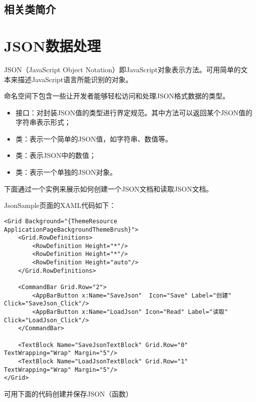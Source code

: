 \subsection{相关类简介}

\section{JSON数据处理}

JSON（JavaScript Object Notation）即JavaScript对象表示方法。可用简单的文本来描述JavaScript语言所能识别的对象。

命名空间下包含一些让开发者能够轻松访问和处理JSON格式数据的类型。

\begin{itemize}
	\item {}接口：对封装JSON值的类型进行界定规范。其中方法可以返回某个JSON值的字符串表示形式；
	\item {}类：表示一个简单的JSON值，如字符串、数值等。
	\item {}类：表示JSON中的数值；
	\item {}类：表示一个单独的JSON对象。
\end{itemize}

下面通过一个实例来展示如何创建一个JSON文档和读取JSON文档。

JsonSample页面的XAML代码如下：

\begin{lstlisting}[style=XamlStyle]
<Grid Background="{ThemeResource ApplicationPageBackgroundThemeBrush}">
	<Grid.RowDefinitions>
		<RowDefinition Height="*"/>
		<RowDefinition Height="*"/>
		<RowDefinition Height="auto"/>
	</Grid.RowDefinitions>

	<CommandBar Grid.Row="2">
		<AppBarButton x:Name="SaveJson"  Icon="Save" Label="创建" Click="SaveJson_Click"/>
		<AppBarButton x:Name="LoadJson" Icon="Read" Label="读取" Click="LoadJson_Click"/>
	</CommandBar>

	<TextBlock Name="SaveJsonTextBlock" Grid.Row="0" TextWrapping="Wrap" Margin="5"/>
	<TextBlock Name="LoadJsonTextBlock" Grid.Row="1" TextWrapping="Wrap" Margin="5"/>
</Grid>
\end{lstlisting}

可用下面的代码创建并保存JSON（函数）

